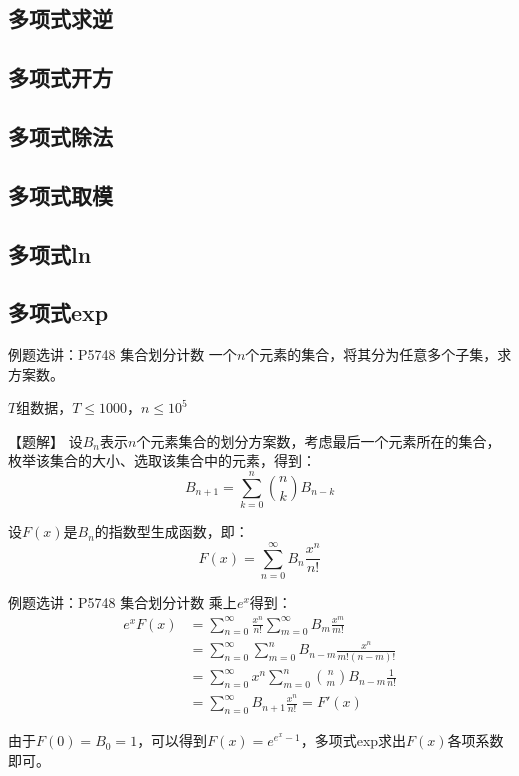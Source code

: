 \documentclass{beamer}
\begin{document}
\subsection{多项式求逆}

\subsection{多项式开方}

\subsection{多项式除法}

\subsection{多项式取模}

\subsection{多项式ln}

\subsection{多项式exp}

\begin{frame}{例题选讲：P5748 集合划分计数}
    \small
    一个$n$个元素的集合，将其分为任意多个子集，求方案数。

    $T$组数据，$T\leq 1000$，$n\leq 10^5$

    \vspace{1em}\pause
    【题解】 设$B_n$表示$n$个元素集合的划分方案数，考虑最后一个元素所在的集合，枚举该集合的大小、选取该集合中的元素，得到：
    \begin{equation*}
        B_{n+1}=\sum_{k=0}^{n}\binom{n}{k}B_{n-k}
    \end{equation*}

    \pause
    设$F(x)$是$B_n$的指数型生成函数，即：
    \begin{equation*}
        F(x)=\sum_{n= 0}^\infty B_n \frac{x^n}{n!}
    \end{equation*}
\end{frame}

\begin{frame}{例题选讲：P5748 集合划分计数}
    \small
    乘上$e^x$得到：
    \begin{align*}
        e^xF(x)&=\sum_{n= 0}^\infty \frac{x^n}{n!} \sum_{m= 0}^\infty B_m \frac{x^m}{m!}\\
        &= \sum_{n= 0}^\infty \sum_{m = 0}^n B_{n-m} \frac{x^n}{m!(n-m)!}\\
        &= \sum_{n= 0}^\infty x^n \sum_{m = 0}^n \binom{n}{m} B_{n-m} \frac{1}{n!}\\
        &= \sum_{n= 0}^\infty B_{n+1} \frac{x^n}{n!}= F'(x)
    \end{align*}

    \pause
    由于$F(0)=B_0=1$，可以得到$F(x)=e^{e^x-1}$，多项式exp求出$F(x)$各项系数即可。
\end{frame}
\end{document}
